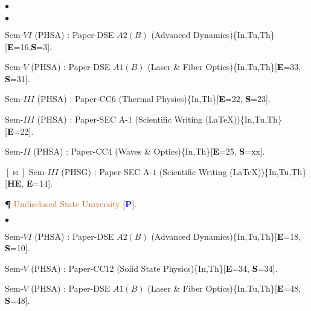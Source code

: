 \documentclass[margin,line]{res}
\newenvironment{list1}{
  \begin{list}{\ding{113}}{%
      \setlength{\itemsep}{0in}
      \setlength{\parsep}{0in} \setlength{\parskip}{0in}
      \setlength{\topsep}{0in} \setlength{\partopsep}{0in} 
      \setlength{\leftmargin}{0.17in}}}{\end{list}}
\newenvironment{list2}{
  \begin{list}{$\bullet$}{%
      \setlength{\itemsep}{0in}
      \setlength{\parsep}{0in} \setlength{\parskip}{0in}
      \setlength{\topsep}{0in} \setlength{\partopsep}{0in} 
      \setlength{\leftmargin}{0.2in}}}{\end{list}}
\begin{document}
\begin{resume}
\begin{list2}
\end{list2}
\begin{list1}
\item[] \textcolor{iris}{}
\vspace{1mm}
\end{list1}
\begin{list2}
\item Sem-$VI$ (PHSA) : Paper-DSE $A2(B)$ (Advanced Dynamics)\textcolor{alizarin}{\{In,Tu,Th\}}[\textcolor{black}{\bf E}=16,\textcolor{black}{\bf S}=3].
\item Sem-$V$ (PHSA) : Paper-DSE $A1(B)$ (Laser \& Fiber Optics)\textcolor{alizarin}{\{In,Tu,Th\}}[\textcolor{black}{\bf E}=33, 
      \textcolor{black}{\bf S}=31].
\item Sem-$III$ (PHSA) : Paper-CC6 (Thermal Physics)\textcolor{alizarin}{\{In,Th\}}[\textcolor{black}{\bf E}=22, \textcolor{black}{\bf S}=23]. 
\item Sem-$III$ (PHSA) : Paper-SEC A-$1$ (Scientific Writing (\LaTeX))\textcolor{alizarin}{\{In,Tu,Th\}}[\textcolor{black}{\bf E}=22]. 
\item Sem-$II$  (PHSA) : Paper-CC4 (Waves \& Optics)\textcolor{alizarin}{\{In,Th\}}[\textcolor{black}{\bf E}=25, \textcolor{black}{\bf S}=xx]. 
\item[$\pmb{[\Join]}$] Sem-$III$ (PHSG) : Paper-SEC A-$1$ (Scientific Writing (\LaTeX))\textcolor{alizarin}{\{In,Tu,Th\}}[\textcolor{asparagus}{\bf HE}, 
     {\textbf E}=14]. 
\item[{\bf \P}] \textcolor{chocolate}{Undisclosed State University} [\textcolor{blue}{\bf P}]. 
\end{list2}
\begin{list1}
\item[] \textcolor{iris}{}
\vspace{1mm}
\end{list1}
\begin{list2}
\item Sem-$VI$ (PHSA) : Paper-DSE $A2(B)$ (Advanced Dynamics)\textcolor{alizarin}{\{In,Tu,Th\}}[\textcolor{black}{\bf E}=18, 
      \textcolor{black}{\bf S}=10].
\item Sem-$V$ (PHSA) : Paper-CC$12$ (Solid State Physics)\textcolor{alizarin}{\{In,Th\}}[\textcolor{black}{\bf E}=34, \textcolor{black}{\bf S}=34]. 
\item Sem-$V$ (PHSA) : Paper-DSE $A1(B)$ (Laser \& Fiber Optics)\textcolor{alizarin}{\{In,Tu,Th\}}[\textcolor{black}{\bf E}=48, \textcolor{black}{\bf S}=48]. 

\end{list2}
\end{resume}
\end{document}
